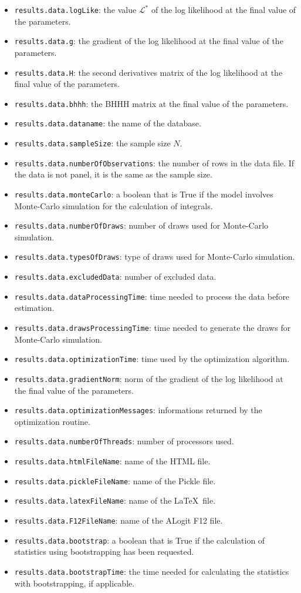 \documentclass[12pt,a4paper]{article}
\begin{document}
\begin{itemize}
\item \lstinline+results.data.logLike+: the value $\mathcal{L}^*$ of
  the log likelihood at the final value of the parameters. 
\item \lstinline+results.data.g+: the gradient of the log likelihood at the final value of the parameters. 
\item \lstinline+results.data.H+: the second derivatives matrix of the log likelihood at the final value of the parameters. 
\item \lstinline+results.data.bhhh+:  the BHHH matrix   at the final value of the parameters. 
\item \lstinline+results.data.dataname+: the name of the database.
\item \lstinline+results.data.sampleSize+: the sample size $N$.
\item \lstinline+results.data.numberOfObservations+: the number of
  rows in the data file. If the data is not panel, it is the same as
  the sample size. 
\item \lstinline+results.data.monteCarlo+: a boolean that is True if
  the model involves Monte-Carlo simulation for the calculation of
  integrals. 
\item \lstinline+results.data.numberOfDraws+: number of draws used for
  Monte-Carlo simulation.
\item \lstinline+results.data.typesOfDraws+: type of draws used for
  Monte-Carlo simulation.
\item \lstinline+results.data.excludedData+: number of excluded data. 
\item \lstinline+results.data.dataProcessingTime+: time needed to
  process the data before estimation. 
\item \lstinline+results.data.drawsProcessingTime+: time needed to
  generate the draws for Monte-Carlo simulation. 
\item \lstinline+results.data.optimizationTime+: time used by the
  optimization algorithm. 
\item \lstinline+results.data.gradientNorm+: norm of the gradient of
  the log likelihood at the final value of the parameters. 
\item \lstinline+results.data.optimizationMessages+: informations returned
  by the optimization routine. 
\item \lstinline+results.data.numberOfThreads+: number of processors
  used. 
\item \lstinline+results.data.htmlFileName+: name of the HTML file. 
\item \lstinline+results.data.pickleFileName+: name of the Pickle
  file. 
\item \lstinline+results.data.latexFileName+: name of the \LaTeX\
  file. 
\item \lstinline+results.data.F12FileName+: name of the ALogit F12 
  file. 
\item \lstinline+results.data.bootstrap+: a boolean that is True if
  the calculation of statistics using bootstrapping has been
  requested. 
\item \lstinline+results.data.bootstrapTime+: the time needed for
  calculating the statistics with bootstrapping, if applicable.
\end{itemize}
\end{document}
